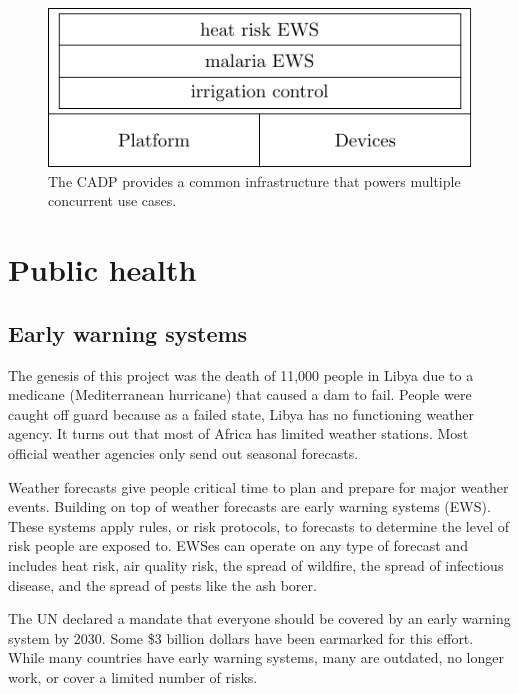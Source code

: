 \documentclass[
]{book}
\begin{document}
\begin{figure}
\includegraphics[width=0.9\linewidth]{_main_files/figure-latex/unnamed-chunk-3-1} \caption{The CADP provides a common infrastructure that powers multiple concurrent use cases.}\label{fig:unnamed-chunk-3}
\end{figure}

\hypertarget{public-health}{%
\section{Public health}\label{public-health}}

\hypertarget{early-warning-systems}{%
\subsection{Early warning systems}\label{early-warning-systems}}

The genesis of this project was the death of 11,000 people in Libya due
to a medicane (Mediterranean hurricane) that caused a dam to fail.
People were caught off guard because as a failed state,
Libya has no functioning weather agency.
It turns out that most of Africa has limited weather stations.
Most official weather agencies only send out seasonal forecasts.

Weather forecasts give people critical time to plan and prepare for
major weather events.
Building on top of weather forecasts are early warning systems (EWS).
These systems apply rules, or risk protocols, to forecasts to determine
the level of risk people are exposed to.
EWSes can operate on any type of forecast and includes heat risk,
air quality risk, the spread of wildfire,
the spread of infectious disease, and the spread of pests like the ash borer.

The UN declared a mandate that everyone should be covered by an early warning
system by 2030. Some \$3 billion dollars have been earmarked for this effort.
While many countries have early warning systems, many are outdated,
no longer work, or cover a limited number of risks.
\end{document}

